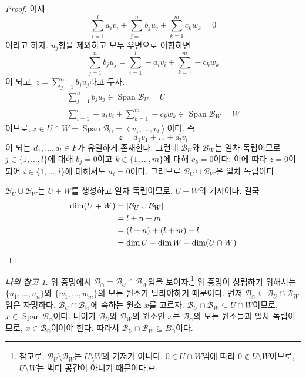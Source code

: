 \documentclass[unfonts,oneside,a4paper]{oblivoir}
\theoremstyle{definition}
\theoremstyle{theorem}
\theoremstyle{remark}
\theoremstyle{remark}
\newtheorem*{myremark}{나의 참고}
\theoremstyle{remark}
\theoremstyle{remark}
\renewcommand{\vec}[1]{\bm{\mathit{#1}}}
\newcommand{\vecz}{\bm{\mathrm{0}}}
\DeclareMathOperator{\Span}{Span}
\begin{document}
\begin{proof}
    이제
    \begin{equation*}
        \sum_{i = 1}^l a_i \vec v_i + \sum_{j = 1}^n b_j \vec u_j + \sum_{k = 1}^m c_k \vec w_k = \vecz
    \end{equation*}
    이라고 하자.
    $\vec u_j$항을 제외하고 모두 우변으로 이항하면
    \begin{equation*}
        \sum_{j = 1}^n b_j \vec u_j = \sum_{i = 1}^l -a_i \vec v_i + \sum_{k = 1}^m -c_k \vec w_k
    \end{equation*}
    이 되고, $\vec z = \sum_{j = 1}^n b_j \vec u_j$라고 두자.
    \begin{align*}
        \sum_{j = 1}^n b_j \vec u_j \in \Span \mathcal B_U = U\\
        \sum_{i = 1}^l -a_i \vec v_i + \sum_{k = 1}^m -c_k \vec w_k \in \Span \mathcal B_W = W
    \end{align*}
    이므로, $\vec z \in U \cap W = \Span \mathcal B_\cap = \left<\vec v_1, \dots, \vec v_l\right>$이다.
    즉
    \[
        \vec z = d_1 \vec v_1 + \dots + d_l \vec v_l
    \]
    이 되는 $d_1, \dots, \vec d_l \in F$가 유일하게 존재한다.
    그런데 $\mathcal B_U$와 $\mathcal B_W$는 일차 독립이므로 $j \in \{1, \dots, l\}$에 대해 $b_j = 0$이고 $k \in \{1, \dots, m\}$에 대해 $c_k = 0$이다.
    이에 따라 $\vec z = \vecz$이 되어 $i \in \{1, \dots, l\}$에 대해서도 $a_i = 0$이다.
    그러므로 $\mathcal B_U \cup \mathcal B_W$은 일차 독립이다.

    $\mathcal B_U \cup \mathcal B_W$는 $U + W$를 생성하고 일차 독립이므로, $U + W$의 기저이다.
    결국
    \begin{align*}
        \dim (U + W) &= |\mathcal B_U \cup \mathcal B_W|\\
                     &= l + n + m\\
                     &= (l + n) + (l + m) - l\\
                     &= \dim U + \dim W - \dim (U \cap W)\qedhere
    \end{align*}
\end{proof}

\begin{myremark}
    위 증명에서 $\mathcal B_\cap = \mathcal B_U \cap \mathcal B_W$임을 보이자.\footnote{참고로, $\mathcal B_U \setminus \mathcal B_W$는 $U \setminus W$의 기저가 아니다.
    $\vecz \in U \cap W$임에 따라 $\vecz \notin U \setminus W$이므로, $U \setminus W$는 벡터 공간이 아니기 때문이다.}
    위 증명이 성립하기 위해서는 $\{\vec u_1, \dots, \vec u_n\}$와 $\{\vec w_1, \dots, \vec w_m\}$의 모든 원소가 달라야하기 때문이다.
    먼저 $\mathcal B_\cap \subseteq \mathcal B_U \cap \mathcal B_W$임은 자명하다.
    $\mathcal B_U \cap \mathcal B_W$에 속하는 원소 $\vec x$를 고르자.
    $\mathcal B_U \cap \mathcal B_W \subseteq U \cap W$이므로, $\vec x \in \Span \mathcal B_\cap$이다.
    나아가 $\mathcal B_U$와 $\mathcal B_W$의 원소인 $\vec x$는 $\mathcal B_\cap$의 모든 원소들과 일차 독립이므로, $\vec x \in \mathcal B_\cap$이어야 한다.
    따라서 $\mathcal B_U \cap \mathcal B_W \subseteq B_\cap$이다.
\end{myremark}
\end{document}

